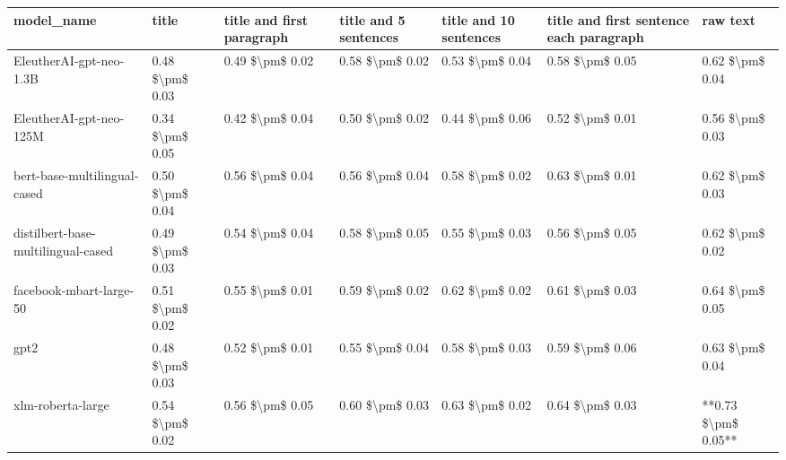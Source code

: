 \begin{tabular}{lllllll}
\toprule
                        model\_name &           title & title and first paragraph & title and 5 sentences & title and 10 sentences & title and first sentence each paragraph &            raw text \\
\midrule
           EleutherAI-gpt-neo-1.3B & 0.48 \$\textbackslash pm\$ 0.03 &           0.49 \$\textbackslash pm\$ 0.02 &       0.58 \$\textbackslash pm\$ 0.02 &        0.53 \$\textbackslash pm\$ 0.04 &                         0.58 \$\textbackslash pm\$ 0.05 &     0.62 \$\textbackslash pm\$ 0.04 \\
           EleutherAI-gpt-neo-125M & 0.34 \$\textbackslash pm\$ 0.05 &           0.42 \$\textbackslash pm\$ 0.04 &       0.50 \$\textbackslash pm\$ 0.02 &        0.44 \$\textbackslash pm\$ 0.06 &                         0.52 \$\textbackslash pm\$ 0.01 &     0.56 \$\textbackslash pm\$ 0.03 \\
      bert-base-multilingual-cased & 0.50 \$\textbackslash pm\$ 0.04 &           0.56 \$\textbackslash pm\$ 0.04 &       0.56 \$\textbackslash pm\$ 0.04 &        0.58 \$\textbackslash pm\$ 0.02 &                         0.63 \$\textbackslash pm\$ 0.01 &     0.62 \$\textbackslash pm\$ 0.03 \\
distilbert-base-multilingual-cased & 0.49 \$\textbackslash pm\$ 0.03 &           0.54 \$\textbackslash pm\$ 0.04 &       0.58 \$\textbackslash pm\$ 0.05 &        0.55 \$\textbackslash pm\$ 0.03 &                         0.56 \$\textbackslash pm\$ 0.05 &     0.62 \$\textbackslash pm\$ 0.02 \\
           facebook-mbart-large-50 & 0.51 \$\textbackslash pm\$ 0.02 &           0.55 \$\textbackslash pm\$ 0.01 &       0.59 \$\textbackslash pm\$ 0.02 &        0.62 \$\textbackslash pm\$ 0.02 &                         0.61 \$\textbackslash pm\$ 0.03 &     0.64 \$\textbackslash pm\$ 0.05 \\
                              gpt2 & 0.48 \$\textbackslash pm\$ 0.03 &           0.52 \$\textbackslash pm\$ 0.01 &       0.55 \$\textbackslash pm\$ 0.04 &        0.58 \$\textbackslash pm\$ 0.03 &                         0.59 \$\textbackslash pm\$ 0.06 &     0.63 \$\textbackslash pm\$ 0.04 \\
                 xlm-roberta-large & 0.54 \$\textbackslash pm\$ 0.02 &           0.56 \$\textbackslash pm\$ 0.05 &       0.60 \$\textbackslash pm\$ 0.03 &        0.63 \$\textbackslash pm\$ 0.02 &                         0.64 \$\textbackslash pm\$ 0.03 & **0.73 \$\textbackslash pm\$ 0.05** \\
\bottomrule
\end{tabular}
